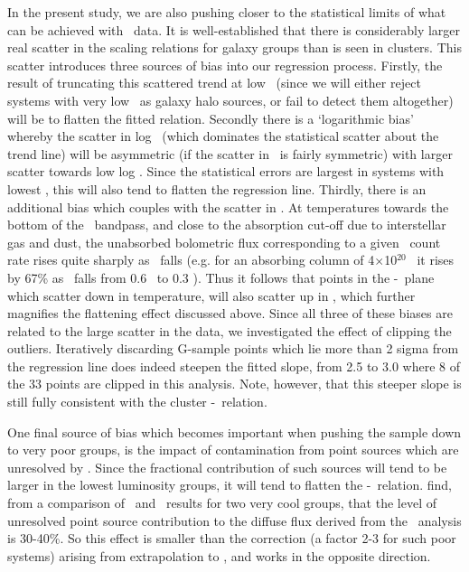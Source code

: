 \documentclass[usenatbib]{mn2e}
\begin{document}
In the present study, we are also pushing closer to the statistical limits of
what can be achieved with \ROSAT\ data. It is well-established that there is
considerably larger real scatter in the scaling relations for galaxy groups than
is seen in clusters.  This scatter introduces three sources of bias into our
regression process.  Firstly, the result of truncating this scattered trend at
low \LX\ (since we will either reject systems with very low \LX\ as galaxy halo
sources, or fail to detect them altogether) will be to flatten the fitted
relation. Secondly there is a `logarithmic bias' whereby the scatter in log \TX\
(which dominates the statistical scatter about the trend line) will be asymmetric
(if the scatter in \TX\ is fairly symmetric) with larger scatter towards low log
\TX.  Since the statistical errors are largest in systems with lowest \LX, this
will also tend to flatten the regression line.  Thirdly, there is an additional
bias which couples with the scatter in \TX.  At temperatures towards the bottom
of the \ROSAT\ bandpass, and close to the absorption cut-off due to interstellar
gas and dust, the unabsorbed bolometric flux corresponding to a given \PSPC\
count rate rises quite sharply as \TX\ falls (e.g. for an absorbing column of
4$\times$10$^{20}$ \pcmsq\ it rises by 67\% as \TX\ falls from 0.6 \kev\ to 0.3
\kev).  Thus it follows that points in the \LX-\TX\ plane which scatter down in
temperature, will also scatter up in \LX, which further magnifies the flattening
effect discussed above.  Since all three of these biases are related to the large
scatter in the data, we investigated the effect of clipping the outliers.
Iteratively discarding G-sample points which lie more than 2 sigma from the
regression line does indeed steepen the fitted slope, from 2.5 to 3.0 where 8 of
the 33 points are clipped in this analysis.  Note, however, that this steeper
slope is still fully consistent with the cluster \LX-\TX\ relation.

One final source of bias which becomes important when pushing the sample down to
very poor groups, is the impact of contamination from point sources which are
unresolved by \ROSAT.  Since the fractional contribution of such sources will
tend to be larger in the lowest luminosity groups, it will tend to flatten the
\LX-\TX\ relation.  \citet*{helsdon04} find, from a comparison of \Chandra\ and
\ROSAT\ results for two very cool groups, that the level of unresolved point
source contribution to the diffuse flux derived from the \PSPC\ analysis is
30-40\%.  So this effect is smaller than the correction (a factor 2-3 for such
poor systems) arising from extrapolation to \rfh, and works in the opposite
direction.
\end{document}
